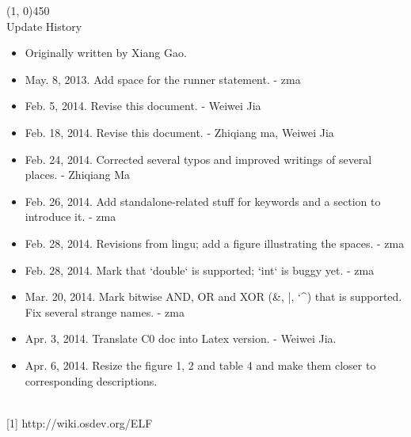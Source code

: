 \documentclass[a4paper]{article}
\begin{document}
\line(1, 0){450}\\

Update History\\

\begin{itemize}
	\item Originally written by Xiang Gao.
	\item May. 8, 2013. Add space for the runner statement. - zma
	\item Feb. 5, 2014. Revise this document. - Weiwei Jia
	\item Feb. 18, 2014. Revise this document. - Zhiqiang ma, Weiwei Jia
	\item Feb. 24, 2014. Corrected several typos and improved writings of several places. - Zhiqiang Ma
	\item Feb. 26, 2014. Add standalone-related stuff for keywords and a section to introduce it. - zma
	\item Feb. 28, 2014. Revisions from lingu; add a figure illustrating the spaces. - zma
	\item Feb. 28, 2014. Mark that `double` is supported; `int` is buggy yet. - zma
	\item Mar. 20, 2014. Mark bitwise AND, OR and XOR (\&, |, {\char`\^}) that is supported. Fix several strange names. - zma
	\item Apr. 3, 2014. Translate C0 doc into Latex version. - Weiwei Jia.
    \item Apr. 6, 2014. Resize the figure 1, 2 and table 4 and make them closer to corresponding descriptions.
\end{itemize}

\\

[1] http://wiki.osdev.org/ELF
\end{document}
